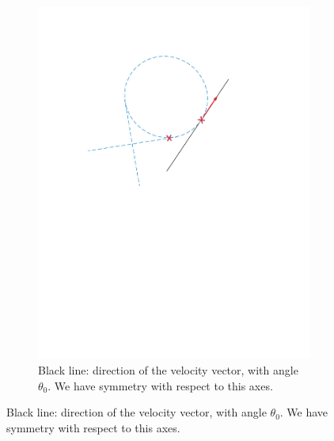 \begin{itemize}
\begin{figure}[!htbp]
\begin{subfigure}[b]{0.45\textwidth}
        \includegraphics[width=\textwidth]{img/circular_movment2.pdf}
        \caption{Black line: direction of the velocity vector, with angle $\theta_0$. We have symmetry with respect to this axes.}
        \label{fig:two}
   \end{subfigure}
   

\end{figure}
\end{itemize}

